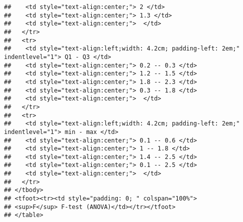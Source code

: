\documentclass[
]{article}
\begin{document}
\begin{verbatim}
##    <td style="text-align:center;"> 2 </td>
##    <td style="text-align:center;"> 1.3 </td>
##    <td style="text-align:center;">  </td>
##   </tr>
##   <tr>
##    <td style="text-align:left;width: 4.2cm; padding-left: 2em;" indentlevel="1"> Q1 - Q3 </td>
##    <td style="text-align:center;"> 0.2 -- 0.3 </td>
##    <td style="text-align:center;"> 1.2 -- 1.5 </td>
##    <td style="text-align:center;"> 1.8 -- 2.3 </td>
##    <td style="text-align:center;"> 0.3 -- 1.8 </td>
##    <td style="text-align:center;">  </td>
##   </tr>
##   <tr>
##    <td style="text-align:left;width: 4.2cm; padding-left: 2em;" indentlevel="1"> min - max </td>
##    <td style="text-align:center;"> 0.1 -- 0.6 </td>
##    <td style="text-align:center;"> 1 -- 1.8 </td>
##    <td style="text-align:center;"> 1.4 -- 2.5 </td>
##    <td style="text-align:center;"> 0.1 -- 2.5 </td>
##    <td style="text-align:center;">  </td>
##   </tr>
## </tbody>
## <tfoot><tr><td style="padding: 0; " colspan="100%">
## <sup>F</sup> F-test (ANOVA)</td></tr></tfoot>
## </table>
\end{verbatim}
\end{document}
